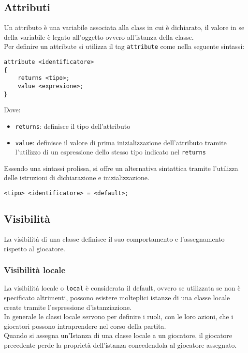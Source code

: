 \subsection{Attributi}
Un attributo è una variabile associata alla class in cui è dichiarato, il valore in se della 
variabile è legato all'oggetto ovvero all'istanza della classe. \\
Per definire un attribute si utilizza il tag \lstinline|attribute| come nella seguente sintassi:
\begin{lstlisting}
attribute <identificatore>
{
    returns <tipo>;     
    value <expresione>;
}
\end{lstlisting}
Dove:
\begin{itemize}
    \item \lstinline|returns|: definisce il tipo dell'attributo
    \item \lstinline|value|: definisce il valore di prima inizializzazione dell'attributo tramite 
    l'utilizzo di un espressione dello stesso tipo indicato nel \lstinline|returns|
\end{itemize}
Essendo una sintassi prolissa, si offre un alternativa sintattica tramite l'utilizza
delle istruzioni di dichiarazione e inizializzazione.
\begin{lstlisting}
<tipo> <identificatore> = <default>; 
\end{lstlisting}

\subsection{Visibilità} \label{VisibilitaClasse}
La visibilità di una classe definisce il suo comportamento e l'assegnamento rispetto al giocatore.

\subsubsection{Visibilità locale}
La visibilità locale o \lstinline|local| è considerata il default, ovvero se utilizzata se non è specificato
altrimenti, possono esistere molteplici istanze di una classe locale create tramite l'espressione d'istanziazione. \\
In generale le classi locale servono per definire i ruoli, con le loro azioni, che i giocatori possono
intraprendere nel corso della partita. \\
Quando si assegna un'Istanza di una classe locale a un giocatore, il giocatore precedente perde la proprietà dell'istanza
concedendola al giocatore assegnato.

